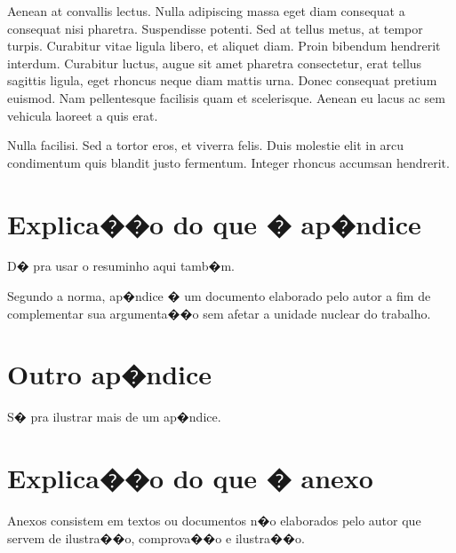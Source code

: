 \documentclass{ppgccufscar}
\begin{document}
Aenean at convallis lectus. Nulla adipiscing massa eget diam consequat a consequat nisi pharetra. Suspendisse potenti. Sed at tellus metus, at tempor turpis. Curabitur vitae ligula libero, et aliquet diam. Proin bibendum hendrerit interdum. Curabitur luctus, augue sit amet pharetra consectetur, erat tellus sagittis ligula, eget rhoncus neque diam mattis urna. Donec consequat pretium euismod. Nam pellentesque facilisis quam et scelerisque. Aenean eu lacus ac sem vehicula laoreet a quis erat.

Nulla facilisi. Sed a tortor eros, et viverra felis. Duis molestie elit in arcu condimentum quis blandit justo fermentum. Integer rhoncus accumsan hendrerit.




\listofacronyms

\apendice

\chapter{Explica��o do que � ap�ndice}

\begin{resumocap}
D� pra usar o resuminho aqui tamb�m.
\end{resumocap}

Segundo a norma, ap�ndice � um documento elaborado pelo autor a fim de complementar sua argumenta��o sem afetar a unidade nuclear do trabalho.

\chapter{Outro ap�ndice}

S� pra ilustrar mais de um ap�ndice.

\anexo

\chapter{Explica��o do que � anexo}

Anexos consistem em textos ou documentos n�o elaborados pelo autor que servem de ilustra��o, comprova��o e ilustra��o.
\end{document}
